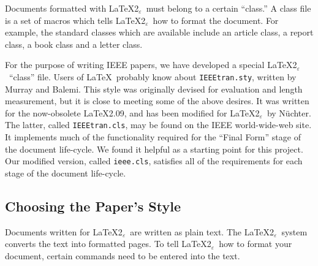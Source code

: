 \documentclass[%
	final,
	notitlepage,
	narroweqnarray,
	inline,
	twoside,
	]{ieee}
\newcommand{\latexiie}{\LaTeX2{\Large$_\varepsilon$}}
\begin{document}
Documents formatted with \latexiie\ must belong to a certain ``class.''
A class file is a set of macros which tells \latexiie\ how to format
the document. For example, the standard classes which are available
include an article class, a report class, a book class and a letter
class.

For the purpose of writing IEEE papers, we have developed a special
\latexiie\ ``class'' file. Users of \LaTeX\ probably know about
\texttt{IEEEtran.sty}, written by Murray and Balemi. This style was 
originally devised for evaluation and length measurement, but it is
close to meeting some of the above desires. It was written for the
now-obsolete \LaTeX 2.09, and has been modified for \latexiie\ by
N\"{u}chter. The latter, called \texttt{IEEEtran.cls}, may be found on
the IEEE world-wide-web site.  It implements much of the functionality
required for the ``Final Form'' stage of the document life-cycle. We
found it helpful as a starting point for this project. Our modified
version, called \texttt{ieee.cls}, satisfies all of the requirements
for each stage of the document life-cycle.

\subsection{Choosing the Paper's Style}

Documents written for \latexiie\ are written as plain text. The
\latexiie\ system converts the text into formatted pages. To tell
\latexiie\ how to format your document, certain commands need to be
entered into the text.
\end{document}
